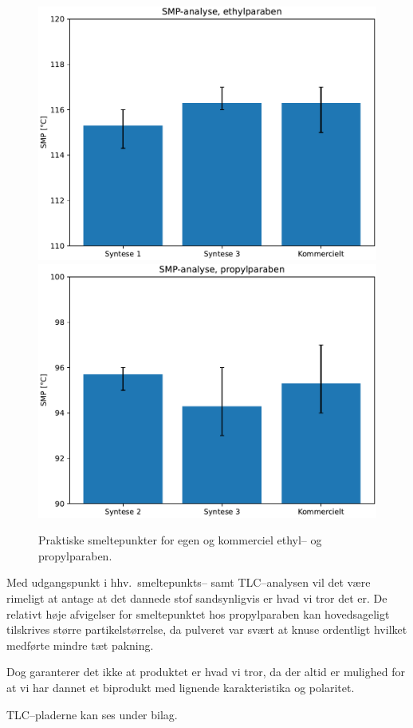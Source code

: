     \begin{figure}[H]
        \includegraphics[width=.48\linewidth]{billeder/ethylsmp}
        \includegraphics[width=.48\linewidth]{billeder/propylsmp}
        \caption{Praktiske smeltepunkter for egen og kommerciel ethyl-- og propylparaben.}
    \end{figure}
    Med udgangspunkt i hhv.\ smeltepunkts-- samt TLC--analysen vil det være rimeligt at antage at det dannede stof sandsynligvis er hvad vi tror det er. De relativt høje afvigelser for smeltepunktet hos propylparaben kan hovedsageligt tilskrives større partikelstørrelse, da pulveret var svært at knuse ordentligt hvilket medførte mindre tæt pakning.

    Dog garanterer det ikke at produktet er hvad vi tror, da der altid er mulighed for at vi har dannet et biprodukt med lignende karakteristika og polaritet.

    TLC--pladerne kan ses under bilag.

